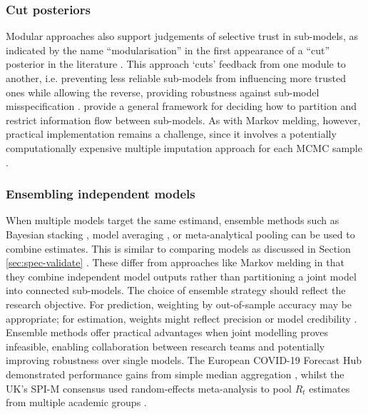 \documentclass{article}
\begin{document}
\subsubsection{Cut posteriors}

Modular approaches also support judgements of selective trust in sub-models, as indicated by the name ``modularisation'' in the first appearance of a ``cut'' posterior in the literature \citep{LiuEtAl2009}. This approach `cuts' feedback from one module to another, i.e. preventing less reliable sub-models from influencing more trusted ones while allowing the reverse, providing robustness against sub-model misspecification \citep{plummer2015cuts,carmona2022scalable,yu2023variational}. \citet{liu2025general} provide a general framework for deciding how to partition and restrict information flow between sub-models. As with Markov melding, however, practical implementation remains a challenge, since it involves a potentially computationally expensive multiple imputation approach for each MCMC sample \citep{plummer2015cuts}.

\subsubsection{Ensembling independent models}\label{sec:ensembling}

When multiple models target the same estimand, ensemble methods such as Bayesian stacking \citep{yao2018using}, model averaging \citep{hoeting1999bayesian}, or meta-analytical pooling \citep{jackson2011multivariate} can be used to combine estimates.
This is similar to comparing models as discussed in Section \ref{sec:spec-validate} .
These differ from approaches like Markov melding in that they combine independent model outputs rather than partitioning a joint model into connected sub-models.
The choice of ensemble strategy should reflect the research objective.
For prediction, weighting by out-of-sample accuracy may be appropriate; for estimation, weights might reflect precision or model credibility \citep{yao2018using}.
Ensemble methods offer practical advantages when joint modelling proves infeasible, enabling collaboration between research teams and potentially improving robustness over single models.
The European COVID-19 Forecast Hub demonstrated performance gains from simple median aggregation \citep{sherratt2021exploring}, whilst the UK's SPI-M consensus used random-effects meta-analysis to pool $R_t$ estimates from multiple academic groups \citep{manley2024combining}.
\end{document}
